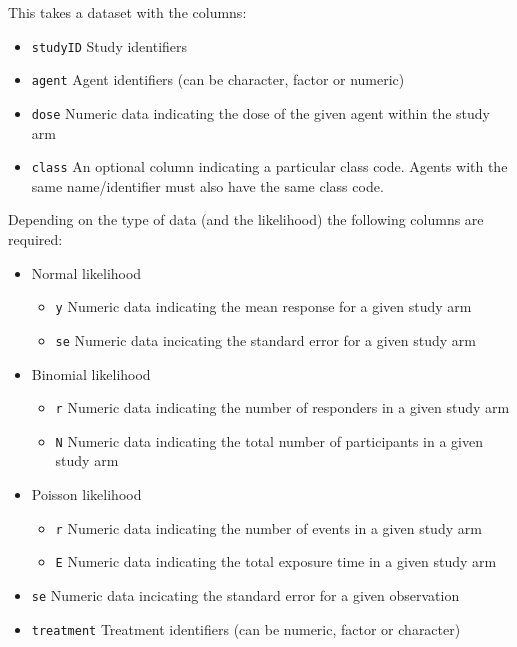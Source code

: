 \documentclass[]{article}
\providecommand{\tightlist}{%
  \setlength{\itemsep}{0pt}\setlength{\parskip}{0pt}}
\begin{document}
This takes a dataset with the columns:

\begin{itemize}
\tightlist
\item
  \texttt{studyID} Study identifiers
\item
  \texttt{agent} Agent identifiers (can be character, factor or numeric)
\item
  \texttt{dose} Numeric data indicating the dose of the given agent
  within the study arm
\item
  \texttt{class} An optional column indicating a particular class code.
  Agents with the same name/identifier must also have the same class
  code.
\end{itemize}

Depending on the type of data (and the likelihood) the following columns
are required:

\begin{itemize}
\tightlist
\item
  Normal likelihood

  \begin{itemize}
  \tightlist
  \item
    \texttt{y} Numeric data indicating the mean response for a given
    study arm
  \item
    \texttt{se} Numeric data incicating the standard error for a given
    study arm
  \end{itemize}
\item
  Binomial likelihood

  \begin{itemize}
  \tightlist
  \item
    \texttt{r} Numeric data indicating the number of responders in a
    given study arm
  \item
    \texttt{N} Numeric data indicating the total number of participants
    in a given study arm
  \end{itemize}
\item
  Poisson likelihood

  \begin{itemize}
  \tightlist
  \item
    \texttt{r} Numeric data indicating the number of events in a given
    study arm
  \item
    \texttt{E} Numeric data indicating the total exposure time in a
    given study arm
  \end{itemize}
\item
  \texttt{se} Numeric data incicating the standard error for a given
  observation
\item
  \texttt{treatment} Treatment identifiers (can be numeric, factor or
  character)
\end{itemize}
\end{document}
